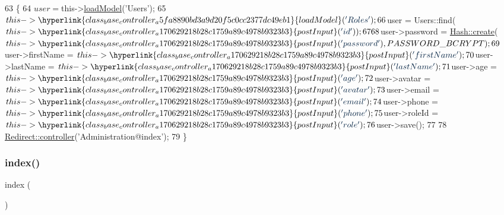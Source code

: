 \begin{DoxyCode}
63                                    \{
64         $user = $this->\hyperlink{class_base_controller_a5fa8890bd3a9d20f5c0cc2377dc49eb1}{loadModel}(\textcolor{stringliteral}{'Users'});
65         $this->\hyperlink{class_base_controller_a5fa8890bd3a9d20f5c0cc2377dc49eb1}{loadModel}(\textcolor{stringliteral}{'Roles'});
66         $user = Users::find($this->\hyperlink{class_base_controller_a170629218b28c1759a89c4978b9323b3}{postInput}(\textcolor{stringliteral}{'id'}));
67 
68         $user->password = \hyperlink{class_hash_a8e076eebb2dc8fc9cb289212c79ad9b8}{Hash::create}($this->\hyperlink{class_base_controller_a170629218b28c1759a89c4978b9323b3}{postInput}(\textcolor{stringliteral}{'password'}), PASSWORD\_BCRYPT);
69         $user->firstName = $this->\hyperlink{class_base_controller_a170629218b28c1759a89c4978b9323b3}{postInput}(\textcolor{stringliteral}{'firstName'});
70         $user->lastName = $this->\hyperlink{class_base_controller_a170629218b28c1759a89c4978b9323b3}{postInput}(\textcolor{stringliteral}{'lastName'});
71         $user->age = $this->\hyperlink{class_base_controller_a170629218b28c1759a89c4978b9323b3}{postInput}(\textcolor{stringliteral}{'age'});
72         $user->avatar = $this->\hyperlink{class_base_controller_a170629218b28c1759a89c4978b9323b3}{postInput}(\textcolor{stringliteral}{'avatar'});
73         $user->email = $this->\hyperlink{class_base_controller_a170629218b28c1759a89c4978b9323b3}{postInput}(\textcolor{stringliteral}{'email'});
74         $user->phone = $this->\hyperlink{class_base_controller_a170629218b28c1759a89c4978b9323b3}{postInput}(\textcolor{stringliteral}{'phone'});
75         $user->roleId = $this->\hyperlink{class_base_controller_a170629218b28c1759a89c4978b9323b3}{postInput}(\textcolor{stringliteral}{'role'});
76         $user->save();
77 
78         \hyperlink{class_redirect_ab7d0d268b6aaa9a5470b7cb8c7eb1b61}{Redirect::controller}(\textcolor{stringliteral}{'Administration@index'});
79     \}
\end{DoxyCode}
\hypertarget{class_administration_a149eb92716c1084a935e04a8d95f7347}{}\label{class_administration_a149eb92716c1084a935e04a8d95f7347} 
\subsubsection{\texorpdfstring{index()}{index()}}
{\footnotesize\ttfamily index (\begin{DoxyParamCaption}{ }\end{DoxyParamCaption})}



